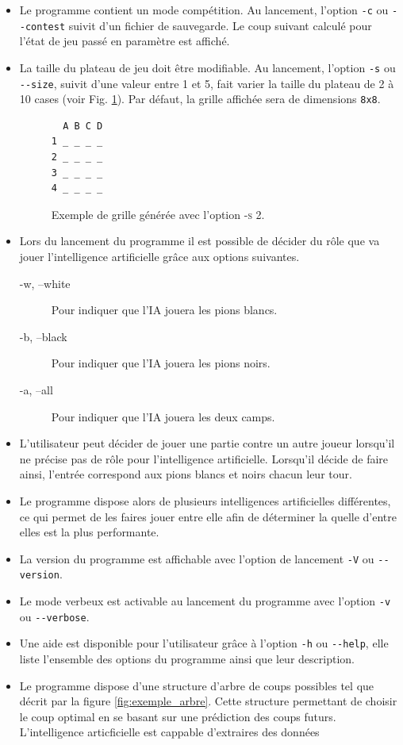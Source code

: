 \documentclass[10pt,a4paper]{article}
\begin{document}
\begin{itemize}
\item Le programme contient un mode compétition. Au lancement, l'option \verb!-c! ou \verb!--contest! suivit d'un fichier de sauvegarde. Le coup suivant calculé pour l'état de jeu passé en paramètre est affiché.
\item La taille du plateau de jeu doit être modifiable. Au lancement, l'option \verb!-s! ou \verb!--size!, suivit d'une valeur entre 1 et 5, fait varier la taille du plateau de 2 à 10 cases (voir Fig. \ref{fig:exemple_taille}). Par défaut, la grille affichée sera de dimensions
\verb!8x8!.

\begin{figure}[H]    
\centering
\begin{BVerbatim}
  A B C D
1 _ _ _ _
2 _ _ _ _
3 _ _ _ _
4 _ _ _ _    
\end{BVerbatim}
\caption {Exemple de grille générée avec l'option \textsc{-s 2}.\label{fig:exemple_taille}}
\end{figure}

\item Lors du lancement du programme il est possible de décider du rôle que va jouer l'intelligence artificielle grâce aux options suivantes.
\begin{description}
\item [-w, --white] Pour indiquer que l'IA jouera les pions blancs.
\item [-b, --black] Pour indiquer que l'IA jouera les pions noirs.
\item [-a, --all] Pour indiquer que l'IA jouera les deux camps.
\end{description}
\item L'utilisateur peut décider de jouer une partie contre un autre joueur lorsqu'il ne précise pas de rôle pour l'intelligence artificielle. Lorsqu'il décide de faire ainsi, l'entrée correspond aux pions blancs et noirs chacun leur tour.
\item Le programme dispose alors de plusieurs intelligences artificielles différentes, ce qui permet de les faires jouer entre elle afin de déterminer la quelle d'entre elles est la plus performante. 
\item La version du programme est affichable avec l'option de lancement \verb!-V! ou \verb!--version!. 
\item Le mode verbeux est activable au lancement du programme avec l'option \verb!-v! ou \verb!--verbose!.
\item Une aide est disponible pour l'utilisateur grâce à l'option \verb!-h! ou \verb!--help!, elle liste l'ensemble des options du programme ainsi que leur description.
\item Le programme dispose d'une structure d'arbre de coups possibles tel que décrit par la figure \ref{fig:exemple_arbre}. Cette structure permettant de choisir le coup optimal en se basant sur une prédiction des coups futurs. L'intelligence articficielle est cappable d'extraires des données  
\end{itemize}
\end{document}
